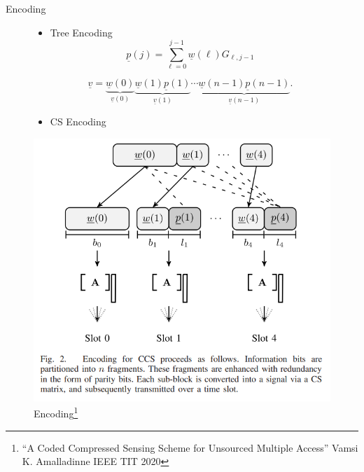\documentclass[aspectratio=169, handout, 10pt, hyperref=colorlinks]{beamer}
\begin{document}
\begin{frame}{Encoding}
    \begin{figure}
        \begin{minipage}{0.5\linewidth}
            \begin{itemize}
                \item Tree Encoding
                \begin{equation*}
                    \underline{p}(j)=\sum_{\ell=0}^{j-1}\underline{w}(\ell)G_{\ell,j-1}
                \end{equation*}
               
                \begin{equation*}
                    \underline{v}=\underbrace{\underline{w}(0)}_{\underline{v}(0)}\underbrace{\underline{w}(1)\underline{p}(1)}_{\underline{v}(1)}\cdots\underbrace{\underline{w}(n-1)\underline{p}(n-1)}_{\underline{v}(n-1)}.
                \end{equation*}
                \item CS Encoding 
            \end{itemize}
        \end{minipage}%
        \begin{minipage}{0.5\linewidth}
            \centering
            \includegraphics[width=\linewidth]{images_CCS/fig2.png}
            \caption{Encoding\footnote{``A Coded Compressed Sensing Scheme for
Unsourced Multiple Access'' Vamsi K. Amalladinne IEEE TIT 2020}}
            \label{fig:dataset}
        \end{minipage}
    \end{figure}
\end{frame}
\end{document}
